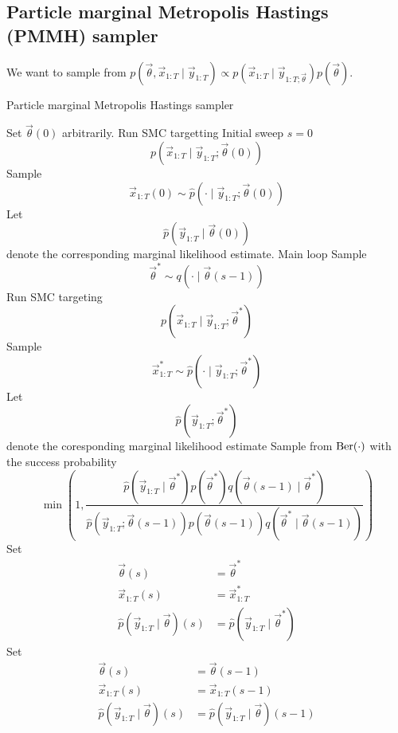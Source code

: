 \subsection{Particle marginal Metropolis Hastings (PMMH) sampler}
We want to sample from $p(\vec \theta, \vec x_{1:T} \mid \vec y_{1:T}) \propto p(\vec x_{1:T} \mid \vec y_{1:T; \vec \theta}) p(\vec \theta)$.
    \begin{algorithm}
    \caption{Particle marginal Metropolis Hastings sampler}\label{alg:pmmh}
        \begin{algorithmic}[1]
            \State Set $\vec \theta(0)$ arbitrarily.
            \State Run SMC targetting \Comment Initial sweep $s = 0$
                $$p(\vec x_{1:T} \mid \vec y_{1:T}; \vec \theta(0))$$
            \State Sample
                $$\vec x_{1:T}(0) \sim \hat p(\cdot \mid \vec y_{1:T}; \vec \theta(0))$$
            \State Let
                $$\hat p(\vec y_{1:T} \mid \vec \theta(0))$$
                denote the corresponding marginal likelihood estimate.
             \Comment Main loop
                \State Sample
                    $$\vec \theta^\ast \sim q(\cdot \mid \vec \theta(s - 1))$$
                \State Run SMC targeting
                    $$p(\vec x_{1:T} \mid \vec y_{1:T}; \vec \theta^\ast)$$
                \State Sample
                    $$\vec x^\ast_{1:T} \sim \hat p(\cdot \mid \vec y_{1:T}; \vec \theta^\ast)$$
                \State Let
                    $$\hat p(\vec y_{1:T}; \vec \theta^\ast)$$
                    denote the coresponding marginal likelihood estimate
                \State Sample from $\operatorname{Ber}(\cdot)$ with the success probability
                    $$\min\left(1, \frac{\hat p(\vec y_{1:T} \mid \vec \theta^\ast) p(\vec \theta^\ast) q(\vec \theta(s - 1) \mid \vec \theta^\ast)}{\hat p(\vec y_{1:T}; \vec \theta(s - 1)) p(\vec \theta(s - 1)) q(\vec \theta^\ast \mid \vec \theta(s - 1))}\right)$$
                    \State Set
                        \begin{align*}
                            \vec \theta(s)                              &= \vec \theta^\ast \\
                            \vec x_{1:T}(s)                             &= \vec x_{1:T}^\ast \\
                            \hat p(\vec y_{1:T} \mid \vec \theta)(s)    &= \hat p(\vec y_{1:T} \mid \vec \theta^\ast)
                        \end{align*}
                \Else
                    \State Set
                        \begin{align*}
                            \vec \theta(s)                              &= \vec \theta(s - 1) \\
                            \vec x_{1:T}(s)                             &= \vec x_{1:T}(s - 1) \\
                            \hat p(\vec y_{1:T} \mid \vec \theta)(s)    &= \hat p(\vec y_{1:T} \mid \vec \theta)(s - 1)
                        \end{align*}
                \EndIf
            \EndFor
        \end{algorithmic}
    \end{algorithm}